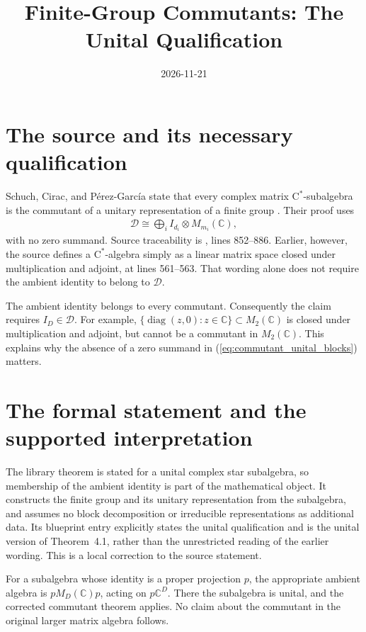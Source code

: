 \documentclass{article}
\title{Finite-Group Commutants: The Unital Qualification}
\author{}
\date{2026-11-21}
\begin{document}
\maketitle
{}

\section{The source and its necessary qualification}
Schuch, Cirac, and P\'erez-Garc\'ia state that every complex matrix
$\mathrm C^*$-subalgebra is the commutant of a unitary representation
of a finite group \cite[Theorem~4.1]{Schuch2010PEPS}. Their proof uses
\begin{align}
    \mathcal D\cong\bigoplus_i I_{d_i}\otimes M_{m_i}(\mathbb C),
    \label{eq:commutant_unital_blocks}
\end{align}
with no zero summand. Source traceability is
, lines 852--886. Earlier, however,
the source defines a $\mathrm C^*$-algebra simply as a linear matrix
space closed under multiplication and adjoint, at lines 561--563.
That wording alone does not require the ambient identity to belong to
$\mathcal D$.

The ambient identity belongs to every commutant. Consequently the
claim requires $I_D\in\mathcal D$. For example,
$\{\operatorname{diag}(z,0):z\in\mathbb C\}\subset M_2(\mathbb C)$
is closed under multiplication and adjoint, but cannot be a commutant
in $M_2(\mathbb C)$. This explains why the absence of a zero summand
in (\ref{eq:commutant_unital_blocks}) matters.

\section{The formal statement and the supported interpretation}
The library theorem is stated for a unital complex star subalgebra,
so membership of the ambient identity is part of the mathematical
object. It constructs the finite group and its unitary representation
from the subalgebra, and assumes no block decomposition or irreducible
representations as additional data. Its blueprint entry explicitly
states the unital qualification and is the unital version of
Theorem~4.1, rather than the unrestricted reading of the earlier
wording. This is a local correction to the source statement.

For a subalgebra whose identity is a proper projection $p$, the
appropriate ambient algebra is $pM_D(\mathbb C)p$, acting on
$p\mathbb C^D$. There the subalgebra is unital, and the corrected
commutant theorem applies. No claim about the commutant in the
original larger matrix algebra follows.



\end{document}
